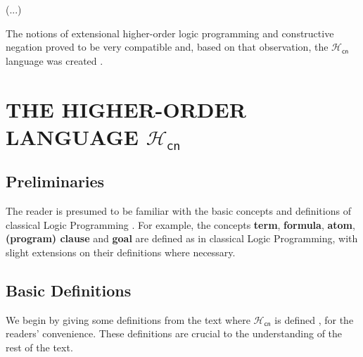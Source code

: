 \documentclass[inscr,ack,preface]{dithesis}
\theoremstyle{definition}
\newcommand{\hcn}{$\mathcal{H}_\mathsf{cn}$}
\begin{document}
(...)

The notions of extensional higher-order logic programming and constructive negation proved to be very compatible and, based on that observation, the \hcn{} language was created \cite{DBLP:conf/kr/CharalambidisR14}.

\chapter{THE HIGHER-ORDER LANGUAGE \hcn}
\label{chap:hcn}

\section{Preliminaries}
The reader is presumed to be familiar with the basic concepts and definitions of classical Logic Programming \cite{Lloyd:1987:FLP:39279}. For example, the concepts \textbf{term}, \textbf{formula}, \textbf{atom}, \textbf{(program) clause} and \textbf{goal} are defined as in classical Logic Programming, with slight extensions on their definitions where necessary.

\section{Basic Definitions}
We begin by giving some definitions from the text where \hcn{} is defined \cite{DBLP:conf/kr/CharalambidisR14}, for the readers' convenience. These definitions are crucial to the understanding of the rest of the text.
\end{document}
